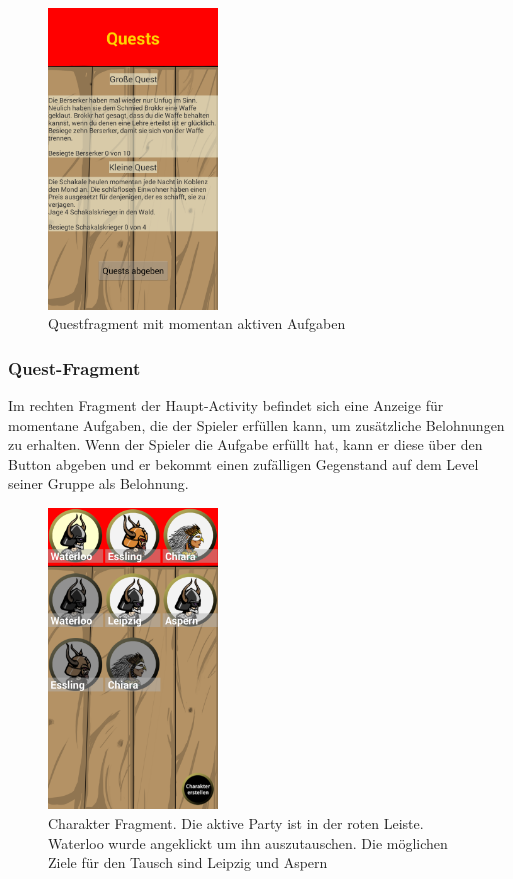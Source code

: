 \documentclass[extern,palatino]{cgBA}
\begin{document}
\newpage
\begin{figure}[htb] 
	\centering
	\includegraphics[width=0.4\textwidth]{questfragment.png}
	\caption{Questfragment mit momentan aktiven Aufgaben}
	\label{fig:Bild3}
\end{figure}
\subsubsection{Quest-Fragment}
Im rechten Fragment der Haupt-Activity befindet sich eine Anzeige für momentane Aufgaben, die der Spieler erfüllen kann, um zusätzliche Belohnungen zu erhalten. Wenn der Spieler die Aufgabe erfüllt hat, kann er diese über den Button abgeben und er bekommt einen zufälligen Gegenstand auf dem Level seiner Gruppe als Belohnung.


\newpage
\begin{figure}[htb] 
	\centering
	\includegraphics[width=0.4\textwidth]{charfragment.png}
	\caption{Charakter Fragment. Die aktive Party ist in der roten Leiste. Waterloo wurde angeklickt um ihn auszutauschen. Die möglichen Ziele für den Tausch sind Leipzig und Aspern}
	\label{fig:Bild2}
\end{figure} 
\end{document}
